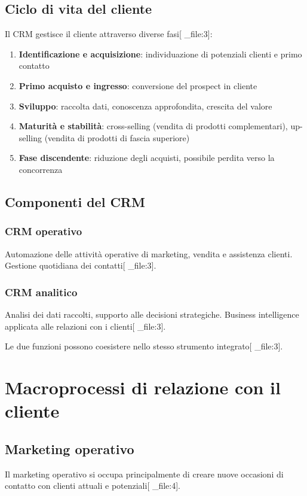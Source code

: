 \documentclass[12pt,a4paper]{article}
\begin{document}
\subsection{Ciclo di vita del cliente}
Il CRM gestisce il cliente attraverso diverse fasi[ _file:3]:

\begin{enumerate}
    \item \textbf{Identificazione e acquisizione}: individuazione di potenziali clienti e primo contatto
    \item \textbf{Primo acquisto e ingresso}: conversione del prospect in cliente
    \item \textbf{Sviluppo}: raccolta dati, conoscenza approfondita, crescita del valore
    \item \textbf{Maturità e stabilità}: cross-selling (vendita di prodotti complementari), up-selling (vendita di prodotti di fascia superiore)
    \item \textbf{Fase discendente}: riduzione degli acquisti, possibile perdita verso la concorrenza
\end{enumerate}

\subsection{Componenti del CRM}

\subsubsection{CRM operativo}
Automazione delle attività operative di marketing, vendita e assistenza clienti. Gestione quotidiana dei contatti[ _file:3].

\subsubsection{CRM analitico}
Analisi dei dati raccolti, supporto alle decisioni strategiche. Business intelligence applicata alle relazioni con i clienti[ _file:3].

Le due funzioni possono coesistere nello stesso strumento integrato[ _file:3].

\section{Macroprocessi di relazione con il cliente}

\subsection{Marketing operativo}
Il marketing operativo si occupa principalmente di creare nuove occasioni di contatto con clienti attuali e potenziali[ _file:4].
\end{document}
